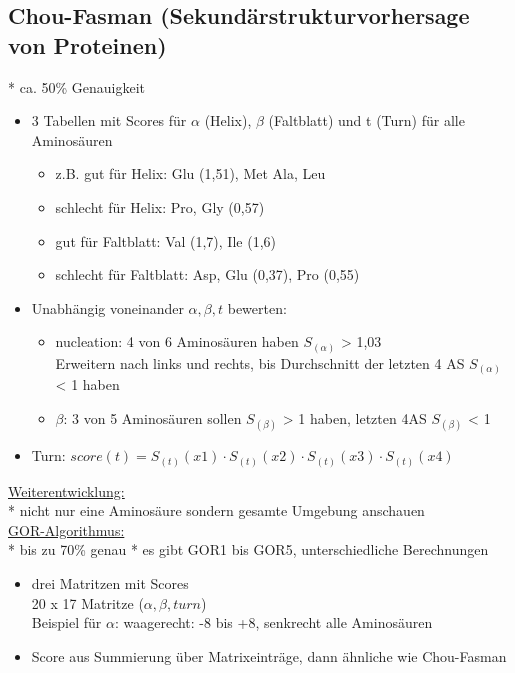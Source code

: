 \subsection{Chou-Fasman (Sekundärstrukturvorhersage von Proteinen)}
 * ca. 50\% Genauigkeit
\begin{itemize}
	\item 3 Tabellen mit Scores für $\alpha$ (Helix), $\beta$ (Faltblatt) und t (Turn) für alle Aminosäuren
	\begin{itemize}
		\item z.B. gut für Helix: Glu (1,51), Met Ala, Leu
		\item schlecht für Helix: Pro, Gly (0,57)
		\item gut für Faltblatt: Val (1,7), Ile (1,6)
		\item schlecht für Faltblatt: Asp, Glu (0,37), Pro (0,55)
	\end{itemize}
	\item Unabhängig voneinander $\alpha, \beta, t$ bewerten:
	\begin{itemize}
		\item nucleation: 4 von 6 Aminosäuren haben $S_{(\alpha)}$ > 1,03\\
		Erweitern nach links und rechts, bis Durchschnitt der letzten 4 AS $S_{(\alpha)}$ < 1 haben
		\item $\beta$: 3 von 5 Aminosäuren sollen $S_{(\beta)}$ > 1 haben, letzten 4AS $S_{(\beta)}$ < 1
	\end{itemize}
		\item Turn: $score(t)=S_{(t)}(x1) \cdot S_{(t)}(x2) \cdot S_{(t)}(x3) \cdot S_{(t)}(x4)$
\end{itemize}

\underline{Weiterentwicklung:}\\
 * nicht nur eine Aminosäure sondern gesamte Umgebung anschauen\\
\underline{GOR-Algorithmus:}\\
 * bis zu 70\% genau
 * es gibt GOR1 bis GOR5, unterschiedliche Berechnungen
\begin{itemize}
	\item drei Matritzen mit Scores\\
	20 x 17 Matritze ($\alpha, \beta, turn$)\\
	Beispiel für $\alpha$: waagerecht: -8 bis +8, senkrecht alle Aminosäuren
	\item Score aus Summierung über Matrixeinträge, dann ähnliche wie Chou-Fasman
\end{itemize}

